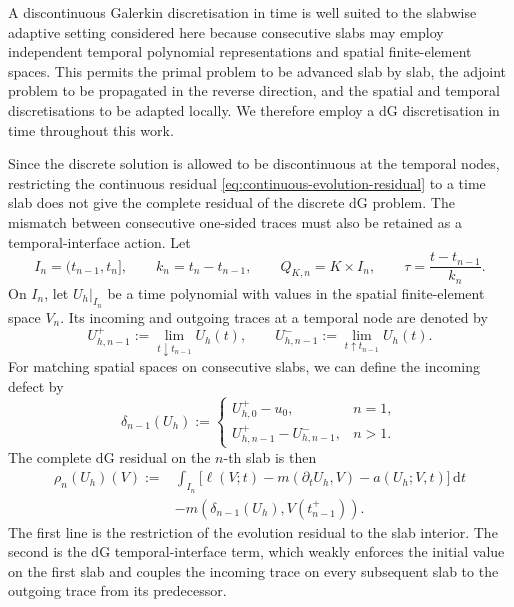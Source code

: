 A discontinuous Galerkin discretisation in time is well suited to the slabwise adaptive setting considered here because consecutive slabs may employ independent temporal polynomial representations and spatial finite-element spaces. This permits the primal problem to be advanced slab by slab, the adjoint problem to be propagated in the reverse direction, and the spatial and temporal discretisations to be adapted locally. We therefore employ a dG discretisation in time throughout this work.

Since the discrete solution is allowed to be discontinuous at the temporal nodes, restricting the continuous residual \eqref{eq:continuous-evolution-residual} to a time slab does not give the complete residual of the discrete dG problem. The mismatch between consecutive one-sided traces must also be retained as a temporal-interface action. Let
\begin{equation}
  I_n=(t_{n-1},t_n],
  \qquad
  k_n=t_n-t_{n-1},
  \qquad
  Q_{K,n}=K\times I_n,
  \qquad
  \tau=\frac{t-t_{n-1}}{k_n}.
  \label{eq:space-time-cell}
\end{equation}
On \(I_n\), let \(U_h|_{I_n}\) be a time polynomial with values in the spatial finite-element space \(V_n\). Its incoming and outgoing traces at a temporal node are denoted by
\begin{equation}
  U_{h,n-1}^{+}
  :=
  \lim_{t\downarrow t_{n-1}}U_h(t),
  \qquad
  U_{h,n-1}^{-}
  :=
  \lim_{t\uparrow t_{n-1}}U_h(t).
  \label{eq:dg-time-traces}
\end{equation}
For matching spatial spaces on consecutive slabs, we can define the incoming defect by
\begin{equation}
  \delta_{n-1}(U_h)
  :=
  \begin{cases}
    U_{h,0}^{+}-u_0,
      & n=1,\\[0.3em]
    U_{h,n-1}^{+}-U_{h,n-1}^{-},
      & n>1.
  \end{cases}
  \label{eq:dg-incoming-defect}
\end{equation}
The complete dG residual on the \(n\)-th slab is then
\begin{equation}
  \begin{aligned}
  \rho_n(U_h)(V)
  :={}&
  \int_{I_n}
  \Big[
    \ell(V;t)
    -
    m(\partial_tU_h,V)
    -
    a(U_h;V,t)
  \Big]\,\mathrm dt
  \\
  &-
  m\!\left(
    \delta_{n-1}(U_h),
    V(t_{n-1}^{+})
  \right).
  \end{aligned}
  \label{eq:complete-slabwise-dg-residual}
\end{equation}
The first line is the restriction of the evolution residual to the slab interior. The second is the dG temporal-interface term, which weakly enforces the initial value on the first slab and couples the incoming trace on every subsequent slab to the outgoing trace from its predecessor. 

